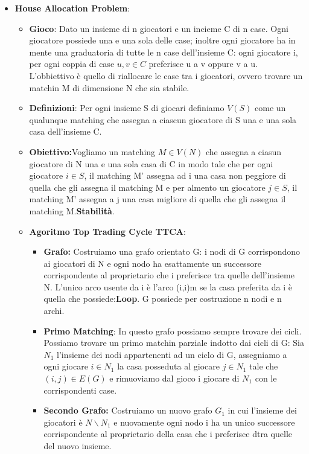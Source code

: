 \documentclass{article}
\theoremstyle{definition}
\theoremstyle{remark}
\begin{document}
\begin{itemize}
\begin{itemize}
\begin{itemize}
        \end{itemize}
        \item \textbf{House Allocation Problem}: \begin{itemize}
            \item \textbf{Gioco}: Dato un insieme di n giocatori e un incieme C di n case. Ogni giocatore possiede una e una sola delle case; inoltre ogni giocatore ha in mente una graduatoria di tutte le n case
             dell'insieme C: ogni giocatore i, per ogni coppia di case \(u,v\in C\) preferisce u a v oppure v a u. L'obbiettivo è quello di riallocare le case tra i giocatori, ovvero trovare un matchin M di dimensione N che sia stabile.
             \item \textbf{Definizioni}: Per ogni insieme S di giocari definiamo \(V(S)\) come un qualunque matching che assegna a ciascun giocatore di S una e una sola casa dell'insieme C.
             \item \textbf{Obiettivo:}Vogliamo un matching \(M\in V(N)\) che assegna a ciasun giocatore di N una e una sola casa di C in modo tale che per ogni giocatore \(i\in S\), il matching M' assegna ad i una casa non peggiore di quella che
             gli assegna il matching M e per almento un giocatore \(j\in S\), il matching M' assegna a j una casa migliore di quella che gli assegna il matching M.\textbf{Stabilità}.
             \item \textbf{Agoritmo Top Trading Cycle TTCA}: \begin{itemize}
                 \item \textbf{Grafo:} Costruiamo una grafo orientato G: i nodi di G corrispondono ai giocatori di N e ogni nodo ha esattamente un successore corrispondente al proprietario che i preferisce tra quelle dell'insieme N.
                 L'unico arco usente da i è l'arco (i,i)m se la casa preferita da i è quella che possiede:\textbf{Loop}.\newline
                 G possiede per costruzione n nodi e n archi.
                 \item \textbf{Primo Matching}: In questo grafo possiamo sempre trovare dei cicli. Possiamo trovare un primo matchin parziale indotto dai cicli di G:\newline
                 Sia \(N_1\) l'insieme dei nodi appartenenti ad un ciclo di G, assegniamo a ogni giocare \(i\in N_1\) la casa posseduta al giocare \(j\in N_1\) tale che \((i,j)\in E(G)\) e rimuoviamo dal gioco i giocare di \(N_1\) con le corrispondenti case.
                 \item\textbf{Secondo Grafo:} Costruiamo un nuovo grafo \(G_1\) in cui l'insieme dei giocatori è \(N\backslash N_1\) e nuovamente ogni nodo i ha un unico successore corrispondente al proprietario della casa che i preferisce dtra quelle del nuovo insieme.\newline

\end{itemize}
\end{itemize}
\end{itemize}
\end{itemize}
\end{document}
